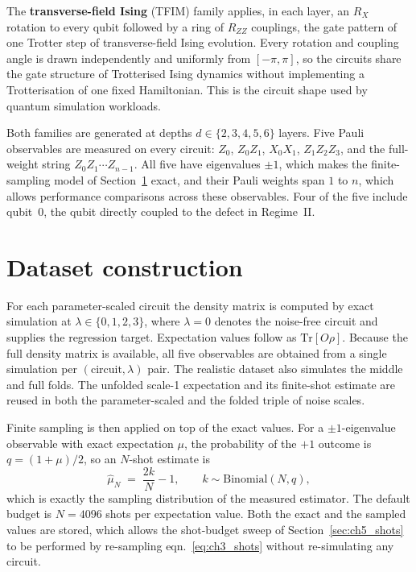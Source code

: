 \documentclass[Thesis.tex]{subfiles}
\begin{document}
The \textbf{transverse-field Ising} (TFIM) family applies, in each layer, an
$R_X$ rotation to every qubit followed by a ring of $R_{ZZ}$ couplings, the gate
pattern of one Trotter step of transverse-field Ising evolution. Every rotation and
coupling angle is drawn independently and uniformly from $[-\pi,\pi]$, so the
circuits share the gate structure of Trotterised Ising dynamics without implementing
a Trotterisation of one fixed Hamiltonian. This is the circuit shape used by quantum
simulation workloads.

Both families are generated at depths $d \in \{2, 3, 4, 5, 6\}$ layers. Five Pauli
observables are measured on every circuit: $Z_0$, $Z_0 Z_1$, $X_0 X_1$,
$Z_1 Z_2 Z_3$, and the full-weight string $Z_0 Z_1 \cdots Z_{n-1}$. All five have
eigenvalues $\pm 1$, which makes the finite-sampling model of
Section~\ref{sec:ch3_dataset} exact, and their Pauli weights span $1$ to $n$, which
allows performance comparisons across these observables. Four of the five
include qubit~$0$, the qubit directly coupled to the defect in Regime~II.

\section{Dataset construction}\label{sec:ch3_dataset}

For each parameter-scaled circuit the density matrix is computed by exact simulation at
$\lambda \in \{0, 1, 2, 3\}$, where $\lambda = 0$ denotes the noise-free circuit and
supplies the regression target. Expectation values follow as
$\mathrm{Tr}[O\rho]$. Because the full density matrix is available, all five
observables are obtained from a single simulation per $(\text{circuit}, \lambda)$
pair. The realistic dataset also simulates the middle and full folds.
The unfolded scale-1 expectation and its finite-shot estimate are reused in both the parameter-scaled and the folded triple of noise scales.

Finite sampling is then applied on top of the exact values. For a $\pm 1$-eigenvalue
observable with exact expectation $\mu$, the probability of the $+1$ outcome is
$q = (1 + \mu)/2$, so an $N$-shot estimate is
\begin{equation}
    \widehat{\mu}_N \;=\; \frac{2k}{N} - 1, \qquad k \sim \mathrm{Binomial}(N, q),
    \label{eq:ch3_shots}
\end{equation}
which is exactly the sampling distribution of the measured estimator. The default
budget is $N = 4096$ shots per expectation value. Both the exact and the sampled
values are stored, which allows the shot-budget sweep of
Section~\ref{sec:ch5_shots} to be performed by re-sampling
eqn.~\eqref{eq:ch3_shots} without re-simulating any circuit.
\end{document}
